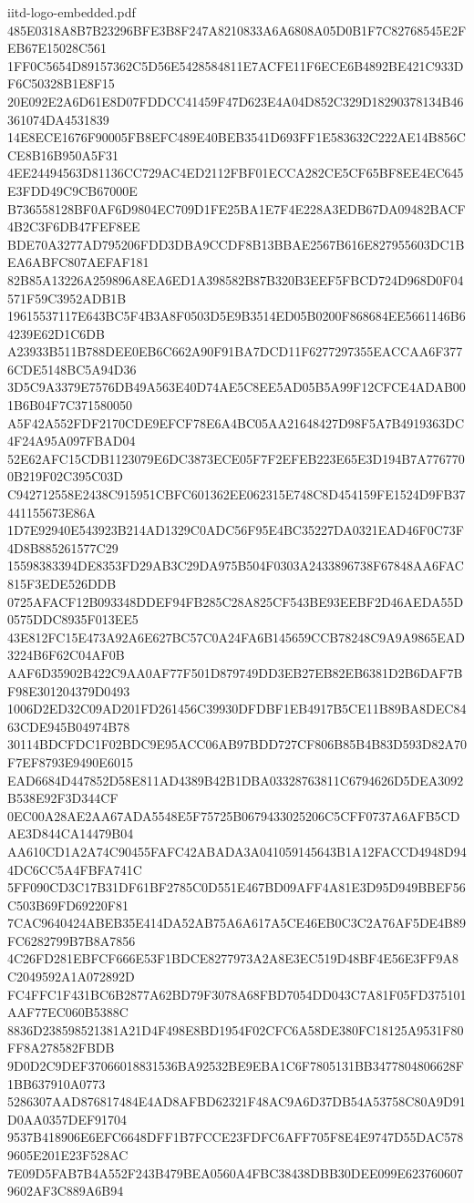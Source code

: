 \begin{filecontents*}[overwrite]{iitd-logo-embedded.pdf}
485E0318A8B7B23296BFE3B8F247A8210833A6A6808A05D0B1F7C82768545E2FEB67E15028C561
1FF0C5654D89157362C5D56E5428584811E7ACFE11F6ECE6B4892BE421C933DF6C50328B1E8F15
20E092E2A6D61E8D07FDDCC41459F47D623E4A04D852C329D18290378134B46361074DA4531839
14E8ECE1676F90005FB8EFC489E40BEB3541D693FF1E583632C222AE14B856CCE8B16B950A5F31
4EE24494563D81136CC729AC4ED2112FBF01ECCA282CE5CF65BF8EE4EC645E3FDD49C9CB67000E
B736558128BF0AF6D9804EC709D1FE25BA1E7F4E228A3EDB67DA09482BACF4B2C3F6DB47FEF8EE
BDE70A3277AD795206FDD3DBA9CCDF8B13BBAE2567B616E827955603DC1BEA6ABFC807AEFAF181
82B85A13226A259896A8EA6ED1A398582B87B320B3EEF5FBCD724D968D0F04571F59C3952ADB1B
19615537117E643BC5F4B3A8F0503D5E9B3514ED05B0200F868684EE5661146B64239E62D1C6DB
A23933B511B788DEE0EB6C662A90F91BA7DCD11F6277297355EACCAA6F3776CDE5148BC5A94D36
3D5C9A3379E7576DB49A563E40D74AE5C8EE5AD05B5A99F12CFCE4ADAB001B6B04F7C371580050
A5F42A552FDF2170CDE9EFCF78E6A4BC05AA21648427D98F5A7B4919363DC4F24A95A097FBAD04
52E62AFC15CDB1123079E6DC3873ECE05F7F2EFEB223E65E3D194B7A7767700B219F02C395C03D
C942712558E2438C915951CBFC601362EE062315E748C8D454159FE1524D9FB37441155673E86A
1D7E92940E543923B214AD1329C0ADC56F95E4BC35227DA0321EAD46F0C73F4D8B885261577C29
15598383394DE8353FD29AB3C29DA975B504F0303A2433896738F67848AA6FAC815F3EDE526DDB
0725AFACF12B093348DDEF94FB285C28A825CF543BE93EEBF2D46AEDA55D0575DDC8935F013EE5
43E812FC15E473A92A6E627BC57C0A24FA6B145659CCB78248C9A9A9865EAD3224B6F62C04AF0B
AAF6D35902B422C9AA0AF77F501D879749DD3EB27EB82EB6381D2B6DAF7BF98E301204379D0493
1006D2ED32C09AD201FD261456C39930DFDBF1EB4917B5CE11B89BA8DEC8463CDE945B04974B78
30114BDCFDC1F02BDC9E95ACC06AB97BDD727CF806B85B4B83D593D82A70F7EF8793E9490E6015
EAD6684D447852D58E811AD4389B42B1DBA03328763811C6794626D5DEA3092B538E92F3D344CF
0EC00A28AE2AA67ADA5548E5F75725B0679433025206C5CFF0737A6AFB5CDAE3D844CA14479B04
AA610CD1A2A74C90455FAFC42ABADA3A041059145643B1A12FACCD4948D944DC6CC5A4FBFA741C
5FF090CD3C17B31DF61BF2785C0D551E467BD09AFF4A81E3D95D949BBEF56C503B69FD69220F81
7CAC9640424ABEB35E414DA52AB75A6A617A5CE46EB0C3C2A76AF5DE4B89FC6282799B7B8A7856
4C26FD281EBFCF666E53F1BDCE8277973A2A8E3EC519D48BF4E56E3FF9A8C2049592A1A072892D
FC4FFC1F431BC6B2877A62BD79F3078A68FBD7054DD043C7A81F05FD375101AAF77EC060B5388C
8836D238598521381A21D4F498E8BD1954F02CFC6A58DE380FC18125A9531F80FF8A278582FBDB
9D0D2C9DEF37066018831536BA92532BE9EBA1C6F7805131BB3477804806628F1BB637910A0773
5286307AAD876817484E4AD8AFBD62321F48AC9A6D37DB54A53758C80A9D91D0AA0357DEF91704
9537B418906E6EFC6648DFF1B7FCCE23FDFC6AFF705F8E4E9747D55DAC5789605E201E23F528AC
7E09D5FAB7B4A552F243B479BEA0560A4FBC38438DBB30DEE099E6237606079602AF3C889A6B94

\end{filecontents*}
